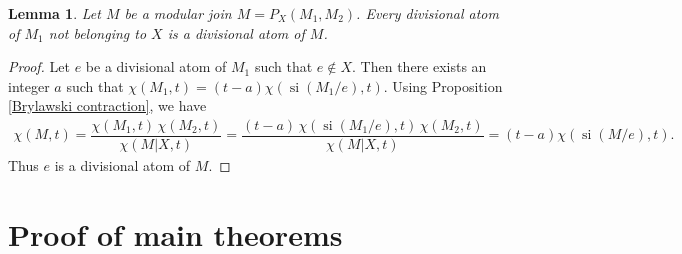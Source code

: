 \documentclass[11pt]{article}
\newtheorem{Lemma}[Theorem]{Lemma}
\DeclareMathOperator{\si}{si}
\begin{document}
\begin{Lemma}\label{divisional atom of modular join}
Let $ M $ be a modular join $ M = P_{X}(M_{1},M_{2}) $.
Every divisional atom of $ M_{1} $ not belonging to $ X $ is a divisional atom of $ M $.
\end{Lemma}
\begin{proof}
Let $ e $ be a divisional atom of $ M_{1} $ such that $ e \not\in X $.
Then there exists an integer $ a $ such that $ \chi(M_{1},t) = (t-a)\chi(\si(M_{1}/e),t) $.
Using Proposition \ref{Brylawski contraction}, we have
\begin{align*}
\chi(M,t) = \dfrac{\chi(M_{1},t) \, \chi(M_{2},t)}{\chi(M|X,t)}
= \dfrac{(t-a) \, \chi(\si(M_{1}/e),t) \, \chi(M_{2},t)}{\chi(M|X,t)}
= (t-a)\chi(\si(M/e),t).
\end{align*}
Thus $ e $ is a divisional atom of $ M $.
\end{proof}

\section{Proof of main theorems}\label{sec: proof}
\end{document}
